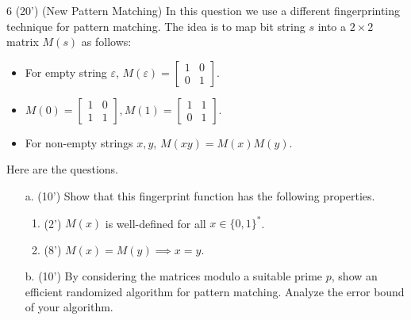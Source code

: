 \begin{question}{6 (20') (New Pattern Matching)}
	In this question we use a different fingerprinting technique for pattern matching. The idea is to map bit string $s$ into a $2\times2$ matrix $M(s)$ as follows:
	\begin{itemize}
		\item For empty string $\varepsilon$, $M(\varepsilon)=\begin{bmatrix}1&0\\0&1\end{bmatrix}$.
		\item $M(0)=\begin{bmatrix}1&0\\1&1\end{bmatrix},M(1)=\begin{bmatrix}1&1\\0&1\end{bmatrix}.$
		\item For non-empty strings $x,y$, $M(xy)=M(x)M(y).$
	\end{itemize}
	
	Here are the questions. 
	\begin{itemize}
		\item[a. (10')] Show that this fingerprint function has the following properties.
		\begin{enumerate}
			\item (2') $M(x)$ is well-defined for all $x\in\{0,1\}^*$.
			\item (8') $M(x)=M(y)\implies x=y$.
		\end{enumerate}
		\item[b. (10')] By considering the matrices modulo a suitable prime $p$, show an efficient randomized algorithm for pattern matching. Analyze the error bound of your algorithm.
	\end{itemize}
\end{question}

